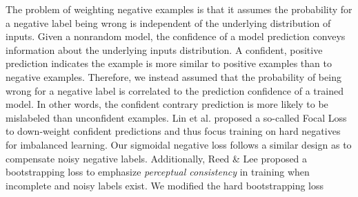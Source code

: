 The problem of weighting negative examples is that it assumes the probability for a negative label being wrong is independent of the underlying distribution of inputs.
Given a nonrandom model, the confidence of a model prediction conveys information about the underlying inputs distribution.
A confident, positive prediction indicates the example is more similar to positive examples than to negative examples.
Therefore, we instead assumed that the probability of being wrong for a negative label is correlated to the prediction confidence of a trained model.
In other words, the confident contrary prediction is more likely to be mislabeled than unconfident examples.
Lin et al.\cite{lin2017focal} proposed a so-called Focal Loss to down-weight confident predictions and thus focus training on hard negatives for imbalanced learning.
Our sigmoidal negative loss follows a similar design as \cite{lin2017focal} to compensate noisy negative labels.
Additionally, Reed \& Lee\cite{reed2014training} proposed a bootstrapping loss to emphasize \textit{perceptual consistency} in training when incomplete and noisy labels exist.
We modified the hard bootstrapping loss
